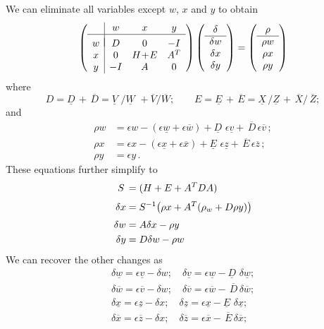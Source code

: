 \documentclass[11pt,a4paper]{article}
\newcommand{\unl}[1]{{\ \!\underline{\;\!\!#1\;\!\!}\ \!}}
\renewcommand{\unl}[1]{{\underline{#1}}}
\newcommand{\ovl}[1]{{\bar{#1}}}
\renewcommand{\ovl}[1]{{\overline{#1}}}
\newcommand{\vl}{{\unl{v}}}
\newcommand{\wl}{{\unl{w}}}
\newcommand{\xl}{{\unl{x}}}
\newcommand{\zl}{{\unl{z}}}
\newcommand{\Dl}{{\underline{D\!}\,}}
\newcommand{\El}{{\underline{E\!}\,}}
\newcommand{\Vl}{{\underline{V\!\!}\,\,}}
\newcommand{\Wl}{{\underline{W\!\!}\,\,}}
\newcommand{\Xl}{{\underline{X\!}\,}}
\newcommand{\Zl}{{\underline{Z\!}\,}}
\newcommand{\vu}{{\ovl{v}}}
\newcommand{\wu}{{\ovl{w}}}
\newcommand{\xu}{{\ovl{x}}}
\newcommand{\zu}{{\ovl{z}}}
\newcommand{\Du}{{\,\overline{\!D}}}
\newcommand{\Eu}{{\,\overline{\!E}}}
\newcommand{\Vu}{{\overline{V}}}
\newcommand{\Wu}{{\overline{W}}}
\newcommand{\Xu}{{\,\overline{\!X}}}
\newcommand{\Zu}{{\,\overline{\!Z}}}
\newcommand{\w}{w}
\newcommand{\x}{x}
\newcommand{\y}{y}
\begin{document}
We can eliminate all variables except $w$, $x$ and $y$ to obtain
\begin{equation*}
\left( \begin{array}{c|ccc}
    & \w&\x&\y \\ \hline \\[-2ex]
  \w & D & 0 & -I \\
  \x & 0 & H\!+\!E & A^T  \\
  \y & -I & A & 0   \\ 
\end{array}\right)
\left( \begin{array}{c} \delta\\\hline \delta\w\\\delta\x\\\delta\y \end{array}\right)
= \left( \begin{array}{c} \rho\\\hline \rho\w\\\rho\x\\\rho\y \end{array}\right)
\end{equation*}
where
\[ D = \Dl + \Du = \Vl/\Wl+\Vu/\Wu; \qquad E = \El + \Eu = \Xl/\Zl+\Xu/\Zu ; \]
and
\[ \begin{aligned} 
      \rho\w &= \epsilon\w - (\epsilon\wl+\epsilon\wu) + \Dl\,\epsilon\vl + \Du\,\epsilon\vu \,; \\
      \rho\x &= \epsilon\x - (\epsilon\xl+\epsilon\xu) + \El\,\epsilon\zl + \Eu\,\epsilon\zu \,; \\
      \rho\y &= \epsilon\y \,.
   \end{aligned} \]
These equations further simplify to
\[ \begin{aligned} 
        S\, &= (H+E+A^TDA) \\[\jot] 
        \delta\x &= S^{-1} \bigl(\rho\x+A^T(\rho_w+D\rho\y)\bigr) \\[\jot] 
        \delta\w &= A \delta\x - \rho\y \\
        \delta\y &= D \delta\w - \rho\w 
   \end{aligned} \]
We can recover the other changes as
\[ \begin{gathered} 
      \delta\wl = \epsilon\vl - \delta\w; \quad \delta\vl = \epsilon\wl - \Dl\,\delta\wl; \\
      \delta\wu = \epsilon\vu - \delta\w; \quad \delta\vu = \epsilon\wu - \Du\,\delta\wu; \\
      \delta\xl = \epsilon\zl - \delta\x; \quad \delta\zl = \epsilon\xl - \El\,\delta\xl; \\
      \delta\xu = \epsilon\zu - \delta\x; \quad \delta\zu = \epsilon\xu - \Eu\,\delta\xu; \\
    \end{gathered} \]
\end{document}
